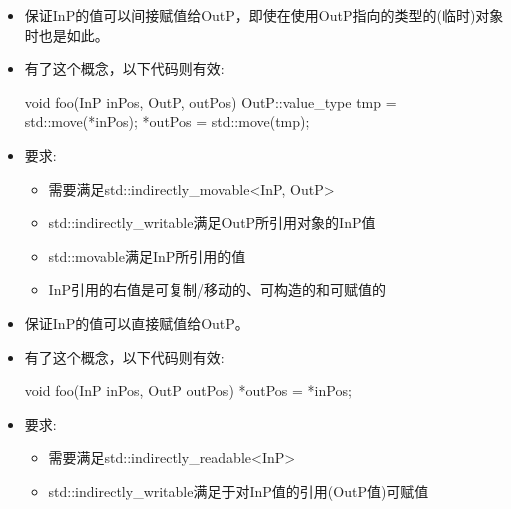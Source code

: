 
\begin{itemize}
\item
保证InP的值可以间接赋值给OutP，即使在使用OutP指向的类型的(临时)对象时也是如此。

\item
有了这个概念，以下代码则有效:

\begin{cpp}
void foo(InP inPos, OutP, outPos) {
	OutP::value_type tmp = std::move(*inPos);
	*outPos = std::move(tmp);
}
\end{cpp}

\item
要求:
\begin{itemize}
\item
需要满足std::indirectly\_movable<InP, OutP>

\item
std::indirectly\_writable满足OutP所引用对象的InP值

\item
std::movable满足InP所引用的值

\item
InP引用的右值是可复制/移动的、可构造的和可赋值的
\end{itemize}
\end{itemize}


\begin{itemize}
\item
保证InP的值可以直接赋值给OutP。

\item
有了这个概念，以下代码则有效:

\begin{cpp}
void foo(InP inPos, OutP outPos) {
	*outPos = *inPos;
}
\end{cpp}

\item
要求:
\begin{itemize}
\item
需要满足std::indirectly\_readable<InP>

\item
std::indirectly\_writable满足于对InP值的引用(OutP值)可赋值
\end{itemize}
\end{itemize}


